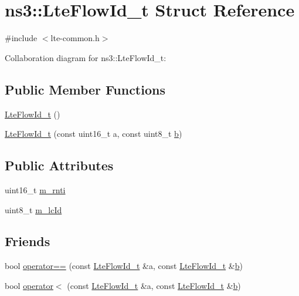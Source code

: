 \hypertarget{structns3_1_1LteFlowId__t}{}\section{ns3\+:\+:Lte\+Flow\+Id\+\_\+t Struct Reference}
\label{structns3_1_1LteFlowId__t}


{\ttfamily \#include $<$lte-\/common.\+h$>$}



Collaboration diagram for ns3\+:\+:Lte\+Flow\+Id\+\_\+t\+:
\subsection*{Public Member Functions}
\begin{DoxyCompactItemize}
\item 
\hyperlink{structns3_1_1LteFlowId__t_a26c527a01eaf0bdbb8e0bf04a2fe1323}{Lte\+Flow\+Id\+\_\+t} ()
\item 
\hyperlink{structns3_1_1LteFlowId__t_a332d396c0c25712aeb74f7c7adb8e7dd}{Lte\+Flow\+Id\+\_\+t} (const uint16\+\_\+t a, const uint8\+\_\+t \hyperlink{lte__pathloss_8m_a21ad0bd836b90d08f4cf640b4c298e7c}{b})
\end{DoxyCompactItemize}
\subsection*{Public Attributes}
\begin{DoxyCompactItemize}
\item 
uint16\+\_\+t \hyperlink{structns3_1_1LteFlowId__t_a702ea933cb2ae3824ce6121f8d20983b}{m\+\_\+rnti}
\item 
uint8\+\_\+t \hyperlink{structns3_1_1LteFlowId__t_a35feedba4d6f5a18fc68f2c9fad8432f}{m\+\_\+lc\+Id}
\end{DoxyCompactItemize}
\subsection*{Friends}
\begin{DoxyCompactItemize}
\item 
bool \hyperlink{structns3_1_1LteFlowId__t_a716cb17add025a454789629eef72bc39}{operator==} (const \hyperlink{structns3_1_1LteFlowId__t}{Lte\+Flow\+Id\+\_\+t} \&a, const \hyperlink{structns3_1_1LteFlowId__t}{Lte\+Flow\+Id\+\_\+t} \&\hyperlink{lte__pathloss_8m_a21ad0bd836b90d08f4cf640b4c298e7c}{b})
\item 
bool \hyperlink{structns3_1_1LteFlowId__t_a3f5859d42bdde5b3de74b333efe623fa}{operator$<$} (const \hyperlink{structns3_1_1LteFlowId__t}{Lte\+Flow\+Id\+\_\+t} \&a, const \hyperlink{structns3_1_1LteFlowId__t}{Lte\+Flow\+Id\+\_\+t} \&\hyperlink{lte__pathloss_8m_a21ad0bd836b90d08f4cf640b4c298e7c}{b})
\end{DoxyCompactItemize}


